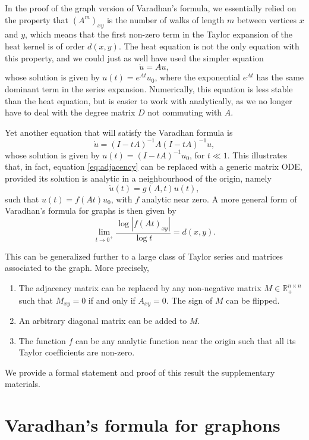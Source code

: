 \documentclass[11pt]{article}
\def\R{\mathbb{R}}
\def\log{\operatorname{log}}
\theoremstyle{definition}
\begin{document}
In the proof of the graph version of Varadhan's formula, we essentially relied on the property that $(A^m)_{xy}$ is the number of walks of length $m$ between vertices $x$ and $y$, which means that the first non-zero term in the Taylor expansion of the heat kernel is of order $d(x,y)$. The heat equation is not the only equation with this property, and we could just as well have used the simpler equation
\begin{equation} \label{eq:adjacency} 
    \dot{u} = Au,
\end{equation}
whose solution is given by $u(t) = e^{At}u_0$, where the exponential $e^{At}$ has the same dominant term in the series expansion. Numerically, this equation is less stable than the heat equation, but is easier to work with analytically, as we no longer have to deal with the degree matrix $D$ not commuting with $A$.

Yet another equation that will satisfy the Varadhan formula is
$$ \dot{u} =  (I - tA)^{-1} A (I-tA)^{-1} u, $$
whose solution is given by $u(t) = (I-tA)^{-1} u_0$, for $t \ll 1$. This illustrates that, in fact, equation \eqref{eq:adjacency} can be replaced with a generic matrix ODE, provided its solution is analytic in a neighbourhood of the origin, namely
$$ \dot{u}(t) = g(A, t) u(t), $$
such that $u(t) = f(At) u_0$, with $f$ analytic near zero. A more general form of Varadhan's formula for graphs is then given by
$$ \lim_{t\rightarrow 0^+} \frac{\log |f(At)_{xy}|}{\log t} = d(x,y). $$

This can be generalized further to a large class of Taylor series and matrices associated to the graph. More precisely, 

\begin{enumerate}
    \item The adjacency matrix can be replaced by any non-negative matrix $M \in \R_+^{n\times n}$ such that $M_{xy} = 0$ if and only if $A_{xy}=0$. The sign of $M$ can be flipped.
    \item An arbitrary diagonal matrix can be added to $M$.
    \item The function $f$ can be any analytic function near the origin such that all its Taylor coefficients are non-zero.
\end{enumerate}

We provide a formal statement and proof of this result the supplementary materials.

\section{Varadhan's formula for graphons} \label{sec:varadhan-graphon}
\end{document}
